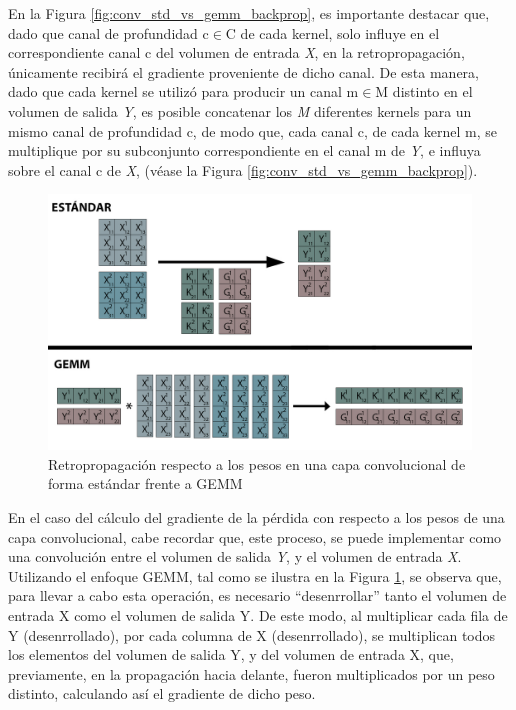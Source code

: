 En la Figura \ref{fig:conv_std_vs_gemm_backprop}, es importante destacar que, dado que canal de profundidad c$\in$C de cada kernel, solo influye en el correspondiente canal c del volumen de entrada \textit{X}, en la retropropagación, únicamente recibirá el gradiente proveniente de dicho canal. De esta manera, dado que cada kernel se utilizó para producir un canal m$\in$M distinto en el volumen de salida \textit{Y}, es posible concatenar los \textit{M} diferentes kernels para un mismo canal de profundidad c, de modo que, cada canal c, de cada kernel m, se multiplique por su subconjunto correspondiente en el canal m de \textit{Y}, e influya sobre el canal c de \textit{X}, (véase la Figura \ref{fig:conv_std_vs_gemm_backprop}). 

\begin{figure}[H]
	\hspace{-25mm}
	\includegraphics[scale=0.33]{imagenes/conv_std_vs_gemm_backprop_pesos.jpg}  
	\caption{Retropropagación respecto a los pesos en una capa convolucional de forma estándar frente a GEMM}
	\label{fig:conv_std_vs_gemm_backprop_pesos}
\end{figure}

En el caso del cálculo del gradiente de la pérdida con respecto a los pesos de una capa convolucional, cabe recordar que, este proceso, se puede implementar como una convolución entre el volumen de salida \textit{Y}, y el volumen de entrada \textit{X}. Utilizando el enfoque GEMM, tal como se ilustra en la Figura \ref{fig:conv_std_vs_gemm_backprop_pesos}, se observa que, para llevar a cabo esta operación, es necesario ``desenrrollar'' tanto el volumen de entrada X como el volumen de salida Y. De este modo, al multiplicar cada fila de Y (desenrrollado), por cada columna de X (desenrrollado), se multiplican todos los elementos del volumen de salida Y, y del volumen de entrada X, que, previamente, en la propagación hacia delante, fueron multiplicados por un peso distinto, calculando así el gradiente de dicho peso.

